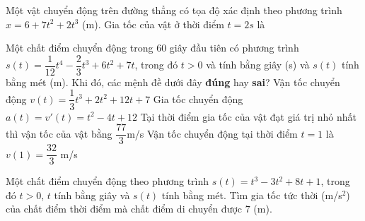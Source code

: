 \begin{bt}%
	Một vật chuyển động trên đường thẳng có tọa độ xác định theo phương trình $x=6+7 t^2+2 t^3$ (m). Gia tốc của vật ở thời điểm $t=2 s$ là
\end{bt}

\begin{ex}%

Một chất điểm chuyển động trong $60$ giây đầu tiên có phương trình \break$s(t)=\dfrac{1}{12}t^4-\dfrac{2}{3}t^3+6t^2+7t$, trong đó $t>0$ và tính bằng giây (s) và $s(t)$ tính bằng mét (m). Khi đó, các mệnh đề dưới đây \textbf{đúng} hay \textbf{sai}?\choiceTF
{Vận tốc chuyển động $v(t)=\dfrac{1}{3}t^3+2t^2+12t+7$}
{\True 	Gia tốc chuyển động $a(t)=v'(t)=t^2-4t+12$}
{\True Tại thời điểm gia tốc của vật đạt giá trị nhỏ nhất thì vận tốc của vật bằng $\dfrac{77}{3} $m/s}
{Vận tốc chuyển động tại thời điểm $t=1$ là $v(1)=\dfrac{32}{3}$ m/s}
\end{ex}

\begin{bt}%
 
	Một chất điểm chuyển động theo phương trình $ s(t)=t^{3}-3t^{2}+8t+1 $, trong đó $ t>0 $, $ t $ tính bằng giây và $ s(t) $ tính bằng mét. Tìm  gia tốc tức thời (m/s$^2$) của chất điểm thời điểm mà chất điểm di chuyển được $ 7 $ (m).
\end{bt}

